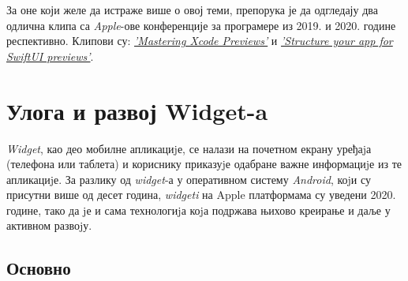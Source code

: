 \documentclass[12pt,oneside]{memoir}
\begin{document}
\indent За оне који желе да истраже више о овој теми, препорука је да одгледају два одлична клипа са \textit{Apple}-ове конференције за програмере из 2019. и 2020. године респективно. Клипови су: \href{https://developer.apple.com/videos/play/wwdc2019/233/}{\textit{'Mastering Xcode Previews'}} и \href{https://developer.apple.com/videos/play/wwdc2020/10149/}{\textit{'Structure your app for SwiftUI previews'}}.

\chapter{Улога и развој Widget-a}

\indent \textit{Widget}, као део мобилне апликациjе, се налази на почетном екрану уређаjа (телефона или таблета) и кориснику приказуjе одабране важне информациjе из те апликациjе. За разлику од \textit{widget}-а у оперативном систему \textit{Android}, коjи су присутни више од десет година, \textit{widgeti} на Apple платформама су уведени 2020. године, тако да jе и сама технологиjа коjа подржава њихово креирање и даље у активном развоjу.

\section{Основно}
\end{document}
